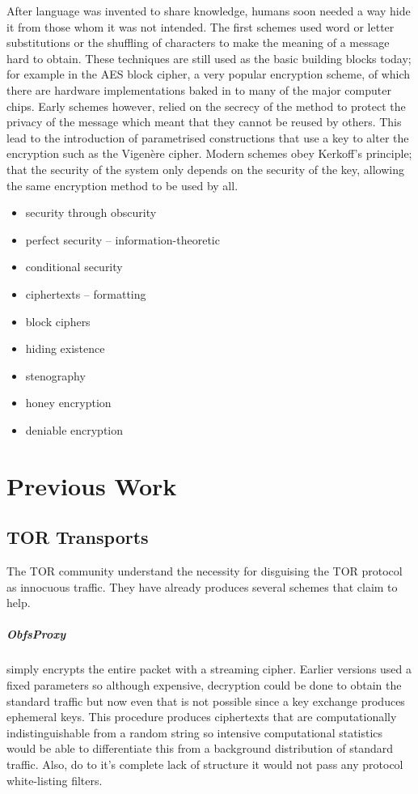 \documentclass[ %
                    author={Samuel Russell},
                supervisor={Prof. Bogdan Warinschi},
                    degree={MEng},
                     title={Innocuous Ciphertexts},
                  subtitle={The DE-CENSOR Scheme},
                      type={research},
                      year={2018} ]{dissertation}
\begin{document}
After language was invented to share knowledge, humans soon needed a way hide it from those whom it was not intended. The first schemes used word or letter substitutions or the shuffling of characters to make the meaning of a message hard to obtain. These techniques are still used as the basic building blocks today; for example in the AES block cipher, a very popular encryption scheme, of which there are hardware implementations baked in to many of the major computer chips. Early schemes however, relied on the secrecy of the method to protect the privacy of the message which meant that they cannot be reused by others. This lead to the introduction of parametrised constructions that use a key to alter the encryption such as the Vigen\`ere cipher. Modern schemes obey Kerkoff's principle; that the security of the system only depends on the security of the key, allowing the same encryption method to be used by all.
\begin{itemize}
 \item security through obscurity
 \item perfect security -- information-theoretic
 \item conditional security
 \item ciphertexts -- formatting
 \item block ciphers
\end{itemize}

\begin{itemize}
 \item hiding existence
 \item stenography
 \item honey encryption
 \item deniable encryption
\end{itemize}

\chapter{Previous Work}\label{prev_work}

\section{TOR Transports}

The TOR community understand the necessity for disguising the TOR protocol as innocuous traffic.
They have already produces several schemes that claim to help.

\paragraph{ObfsProxy} simply encrypts the entire packet with a streaming cipher. Earlier versions used a fixed parameters so although expensive, decryption could be done to obtain the standard traffic but now even that is not possible since a key exchange produces ephemeral keys. This procedure produces ciphertexts that are computationally indistinguishable from a random string so intensive computational statistics would be able to differentiate this from a background distribution of standard traffic. Also, do to it's complete lack of structure it would not pass any protocol white-listing filters.
\end{document}
